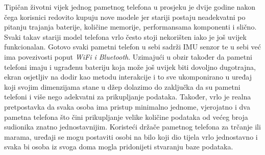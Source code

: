 \documentclass[times, utf8, diplomski]{fer}
\begin{document}
Tipičan životni vijek jednog pametnog telefona u prosjeku je dvije godine nakon čega korisnici redovito kupuju nove modele jer stariji postaju neadekvatni
po pitanju trajanja baterije, količine memorije, performansama komponenti i slično. Svaki takav stariji model telefona vrlo često stoji nekorišten iako je još uvijek
funkcionalan. Gotovo svaki pametni telefon u sebi sadrži IMU senzor te u sebi već ima povezivosti poput \textit{WiFi i Bluetooth}. Uzimajući u obzir
također da pametni telefoni imaju i ugrađenu bateriju koja može još uvijek biti dovoljno dugotrajna, ekran osjetljiv na dodir kao metodu interakcije i to 
sve ukomponirano u uređaj koji svojim dimenzijama stane u džep dolazimo do zaključka da su pametni telefoni i više nego adekvatni za prikupljanje podataka.
Također, vrlo je realna pretpostavka da svaka osoba ima pristup minimalno jednome, vjerojatno i dva pametna telefona što čini prikupljanje velike količine
podataka od većeg broja sudionika znatno jednostavnijim. Koristeći držače pametnog telefona za trčanje ili marama, uređaji se mogu postaviti osobi na bilo koji
dio tijela vrlo jednostavno i svaka bi osoba iz svoga doma mogla pridonijeti stvaranju baze podataka.
\end{document}
